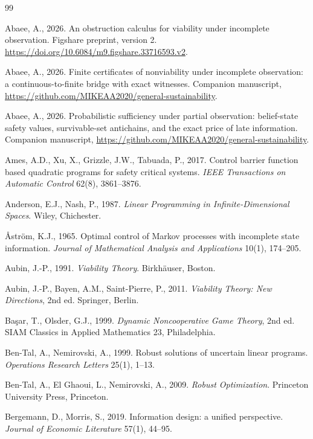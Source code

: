 \documentclass[11pt,a4paper]{article}
\theoremstyle{plain}
\theoremstyle{definition}
\theoremstyle{remark}
\begin{document}
\begin{thebibliography}{99}\footnotesize

 Abaee, A., 2026. An obstruction calculus for viability under incomplete observation. Figshare preprint, version 2. \url{https://doi.org/10.6084/m9.figshare.33716593.v2}.

 Abaee, A., 2026. Finite certificates of nonviability under incomplete observation: a continuous-to-finite bridge with exact witnesses. Companion manuscript, \url{https://github.com/MIKEAA2020/general-sustainability}.

 Abaee, A., 2026. Probabilistic sufficiency under partial observation: belief-state safety values, survivable-set antichains, and the exact price of late information. Companion manuscript, \url{https://github.com/MIKEAA2020/general-sustainability}.

 Ames, A.D., Xu, X., Grizzle, J.W., Tabuada, P., 2017. Control barrier function based quadratic programs for safety critical systems. \emph{IEEE Transactions on Automatic Control} 62(8), 3861--3876.

 Anderson, E.J., Nash, P., 1987. \emph{Linear Programming in Infinite-Dimensional Spaces}. Wiley, Chichester.

 \AA str\"om, K.J., 1965. Optimal control of Markov processes with incomplete state information. \emph{Journal of Mathematical Analysis and Applications} 10(1), 174--205.

 Aubin, J.-P., 1991. \emph{Viability Theory}. Birkh\"auser, Boston.

 Aubin, J.-P., Bayen, A.M., Saint-Pierre, P., 2011. \emph{Viability Theory: New Directions}, 2nd ed. Springer, Berlin.

 Ba\c{s}ar, T., Olsder, G.J., 1999. \emph{Dynamic Noncooperative Game Theory}, 2nd ed. SIAM Classics in Applied Mathematics 23, Philadelphia.

 Ben-Tal, A., Nemirovski, A., 1999. Robust solutions of uncertain linear programs. \emph{Operations Research Letters} 25(1), 1--13.

 Ben-Tal, A., El Ghaoui, L., Nemirovski, A., 2009. \emph{Robust Optimization}. Princeton University Press, Princeton.

 Bergemann, D., Morris, S., 2019. Information design: a unified perspective. \emph{Journal of Economic Literature} 57(1), 44--95.


\end{thebibliography}
\end{document}
